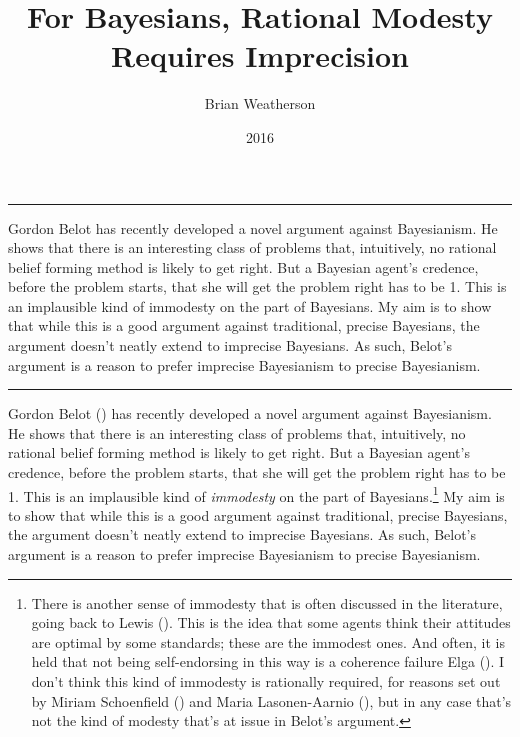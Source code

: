 \documentclass[
  10pt,
  letterpaper,
  DIV=11,
  numbers=noendperiod,
  twoside]{scrartcl}
\title{For Bayesians, Rational Modesty Requires Imprecision}
\author{Brian Weatherson}
\date{2016}
\renewenvironment{abstract}
 {\vspace{-1.25cm}
 \quotation\small\noindent\rule{\linewidth}{.5pt}\par\smallskip
 \noindent }
 {\par\noindent\rule{\linewidth}{.5pt}\endquotation}
\begin{document}
\maketitle
\begin{abstract}
Gordon Belot has recently developed a novel argument against
Bayesianism. He shows that there is an interesting class of problems
that, intuitively, no rational belief forming method is likely to get
right. But a Bayesian agent's credence, before the problem starts, that
she will get the problem right has to be 1. This is an implausible kind
of immodesty on the part of Bayesians. My aim is to show that while this
is a good argument against traditional, precise Bayesians, the argument
doesn't neatly extend to imprecise Bayesians. As such, Belot's argument
is a reason to prefer imprecise Bayesianism to precise Bayesianism.
\end{abstract}


Gordon Belot () has recently developed a
novel argument against Bayesianism. He shows that there is an
interesting class of problems that, intuitively, no rational belief
forming method is likely to get right. But a Bayesian agent's credence,
before the problem starts, that she will get the problem right has to be
1. This is an implausible kind of \emph{immodesty} on the part of
Bayesians.\footnote{There is another sense of immodesty that is often
  discussed in the literature, going back to Lewis
  (). This is the idea that some agents
  think their attitudes are optimal by some standards; these are the
  immodest ones. And often, it is held that not being self-endorsing in
  this way is a coherence failure Elga
  (). I don't think this kind of
  immodesty is rationally required, for reasons set out by Miriam
  Schoenfield () and Maria
  Lasonen-Aarnio (), but in any
  case that's not the kind of modesty that's at issue in Belot's
  argument.} My aim is to show that while this is a good argument
against traditional, precise Bayesians, the argument doesn't neatly
extend to imprecise Bayesians. As such, Belot's argument is a reason to
prefer imprecise Bayesianism to precise Bayesianism.
\end{document}
